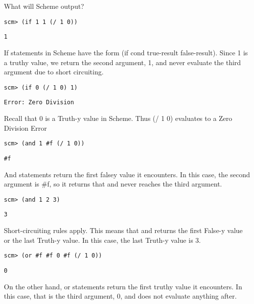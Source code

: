 \begin{blocksection}
\question What will Scheme output?

\begin{lstlisting}
scm> (if 1 1 (/ 1 0))
\end{lstlisting}
\begin{solution}[0.25in]
\begin{lstlisting}
1
\end{lstlisting}
If statements in Scheme have the form (if cond true-result false-result). Since 1 is a truthy value, we return the second argument, 1, and never evaluate the third argument due to short circuiting.
\end{solution}

\begin{lstlisting}
scm> (if 0 (/ 1 0) 1)
\end{lstlisting}
\begin{solution}[0.25in]
\begin{lstlisting}
Error: Zero Division
\end{lstlisting}
Recall that 0 is a Truth-y value in Scheme. Thus (/ 1 0) evaluates to a Zero Division Error
\end{solution}

\begin{lstlisting}
scm> (and 1 #f (/ 1 0))
\end{lstlisting}
\begin{solution}[0.25in]
\begin{lstlisting}
#f
\end{lstlisting}
And statements return the first falsey value it encounters. In this case, the second argument is \#f, so it returns that and never reaches the third argument.
\end{solution}

\begin{lstlisting}
scm> (and 1 2 3)
\end{lstlisting}
\begin{solution}[0.25in]
\begin{lstlisting}
3
\end{lstlisting}
Short-circuiting rules apply. This means that and returns the first False-y value or the last Truth-y value. In this case, the last Truth-y value is 3.
\end{solution}

\begin{lstlisting}
scm> (or #f #f 0 #f (/ 1 0))
\end{lstlisting}
\begin{solution}[0.25in]
\begin{lstlisting}
0
\end{lstlisting}
On the other hand, or statements return the first truthy value it encounters. In this case, that is the third argument, 0, and does not evaluate anything after.
\end{solution}
\end{blocksection}
